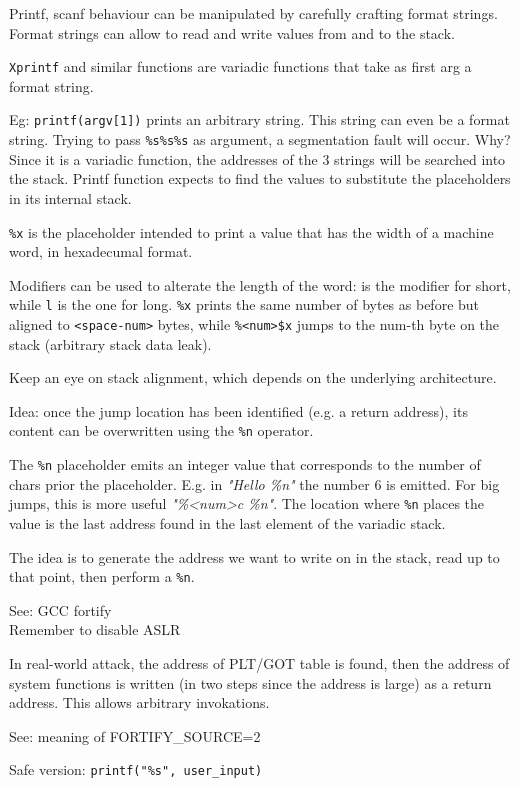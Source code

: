 Printf, scanf behaviour can be manipulated by carefully crafting format strings.
Format strings can allow to read and write values from and to the stack.

\texttt{Xprintf} and similar functions are variadic functions that take as first arg a format string.

Eg: \texttt{printf(argv[1])} prints an arbitrary string. This string can even be a format string.
Trying to pass \texttt{\%s\%s\%s} as argument, a segmentation fault will occur.
Why? Since it is a variadic function, the addresses of the 3 strings will be searched into the stack.
Printf function expects to find the values to substitute the placeholders in its internal stack.

\texttt{\%x} is the placeholder intended to print a value that has the width of a machine word, in hexadecumal format.

Modifiers can be used to alterate the length of the word:  is the modifier for short, while \texttt{l} is the one for long.
\texttt{\%<space-num>x} prints the same number of bytes as before but aligned to \texttt{<space-num>} bytes, while \texttt{\%<num>\$<space-num>x} jumps to the num-th byte on the stack (arbitrary stack data leak).

Keep an eye on stack alignment, which depends on the underlying architecture.

Idea: once the jump location has been identified (e.g. a return address), its content can be overwritten using the \texttt{\%n} operator.

The \texttt{\%n} placeholder emits an integer value that corresponds to the number of chars prior the placeholder.
E.g. in \textit{"Hello \%n"} the number 6 is emitted. For big jumps, this is more useful \textit{"\%<num>c \%n"}.
The location where \texttt{\%n} places the value is the last address found in the last element of the variadic stack.

The idea is to generate the address we want to write on in the stack, read up to that point, then perform a \texttt{\%n}.

See: GCC fortify \\
Remember to disable ASLR

In real-world attack, the address of PLT/GOT table is found, then the address of system functions is written (in two steps since the address is large) as a return address.
This allows arbitrary invokations.

See: meaning of FORTIFY_SOURCE=2

Safe version: \texttt{printf("\%s", user_input)}